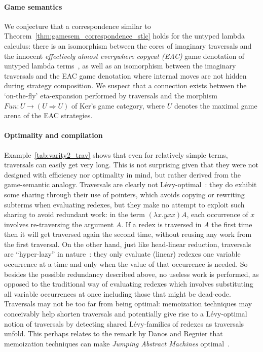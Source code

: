 \documentclass{elsarticle}
\theoremstyle{plain}
\theoremstyle{definition}
\begin{document}
\paragraph{Game semantics} We conjecture that a correspondence similar
to Theorem~\ref{thm:gamesem_correspondence_stlc} holds for
the untyped lambda calculus: there is an isomorphism between the cores of imaginary traversals and the innocent \emph{effectively almost everywhere copycat (EAC)} game denotation of untyped lambda terms~\cite{KerThesis}, as well as an isomorphism between the imaginary traversals and the EAC game denotation where internal moves are not hidden during strategy composition. We suspect that a connection exists between the `on-the-fly' eta-expansion performed by traversals and the morphism $Fun : U \rightarrow (U \Rightarrow U)$ of Ker's game category, where $U$ denotes the maximal game arena of the EAC strategies.

\paragraph{Optimality and compilation}
Example~\ref{tab:varity2_trav} shows that even for relatively simple terms, traversals can easily get very long. This is not surprising given that they were not designed with efficiency nor optimality in mind, but rather derived from the game-semantic analogy.
Traversals are clearly not L\'evy-optimal~\cite{optimal-reduction-levy}: they do exhibit some sharing through their use of pointers, which avoids copying or rewriting subterms when evaluating redexes, but they make no attempt to exploit such sharing to avoid redundant work: in the term $(\lambda x. y x x) A$, each occurrence of $x$ involves re-traversing the argument $A$.
If a redex is traversed in $A$ the first time then it will get traversed again the second time, without reusing any work from the first traversal.
%
On the other hand, just like head-linear reduction, traversals are  ``hyper-lazy'' in nature~\cite{danosherbelinregnier1996}: they only evaluate (linear) redexes one variable occurrence at a time and only when the value of that occurrence is needed. So besides the possible redundancy described above, no useless work is performed, as opposed to the traditional
way of evaluating redexes which involves substituting all variable occurrences at once including those that might be dead-code.
%
Traversals may not be too far from being optimal:
memoization techniques may conceivably help shorten traversals
and potentially give rise to a L\'evy-optimal notion of traversals
by detecting shared L\'evy-families of redexes as traversals unfold.
This perhaps relates to the remark by Danos and Regnier that memoization
techniques can make \emph{Jumping Abstract Machines} optimal~\cite{DANOS199979}.
\end{document}
